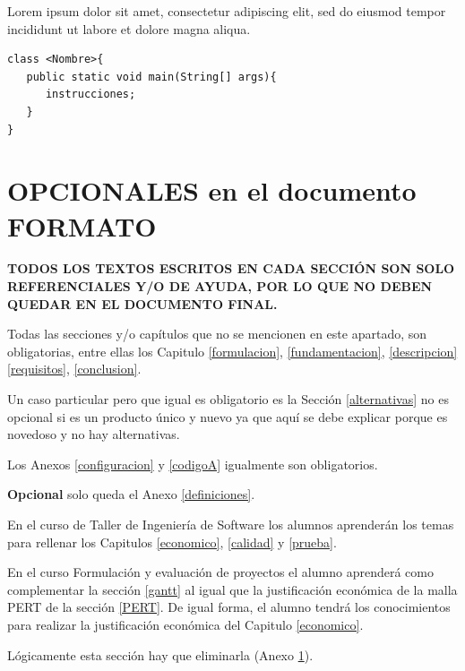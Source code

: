 \documentclass[letter,12pt]{report}
\begin{document}
Lorem ipsum dolor sit amet, consectetur adipiscing elit, sed do eiusmod tempor incididunt ut labore et dolore magna aliqua.

   \lstset{language=java}
\begin{lstlisting}[caption= C\'odigo JAVA de una clase]
class <Nombre>{
   public static void main(String[] args){
      instrucciones;
   }
}
\end{lstlisting}






\chapter{OPCIONALES en el documento FORMATO}\label{opcional}
\textbf{TODOS LOS TEXTOS ESCRITOS EN CADA SECCIÓN SON SOLO REFERENCIALES Y/O DE AYUDA, POR LO QUE NO DEBEN QUEDAR EN EL DOCUMENTO FINAL.}

Todas las secciones y/o capítulos que no se mencionen en este apartado, son obligatorias, entre ellas los Capitulo \ref{formulacion}, \ref{fundamentacion}, \ref{descripcion} \ref{requisitos}, \ref{conclusion}.

Un caso particular pero que igual es obligatorio es la Sección \ref{alternativas} no es opcional si es un producto único y nuevo ya que aquí se debe explicar porque es novedoso y no hay alternativas.

Los Anexos \ref{configuracion} y \ref{codigoA} igualmente son obligatorios.

\textbf{Opcional} solo queda el Anexo \ref{definiciones}.

En el curso de Taller de Ingeniería de Software los alumnos aprenderán los temas para rellenar los Capitulos \ref{economico}, \ref{calidad} y \ref{prueba}.

En el curso Formulación y evaluación de proyectos el alumno aprenderá como complementar la sección \ref{gantt} al igual que la justificación económica de la malla PERT de la sección \ref{PERT}. De igual forma, el alumno tendrá los conocimientos para realizar la justificación económica del Capitulo \ref{economico}.

Lógicamente esta sección hay que eliminarla (Anexo \ref{opcional}).
\end{document}
